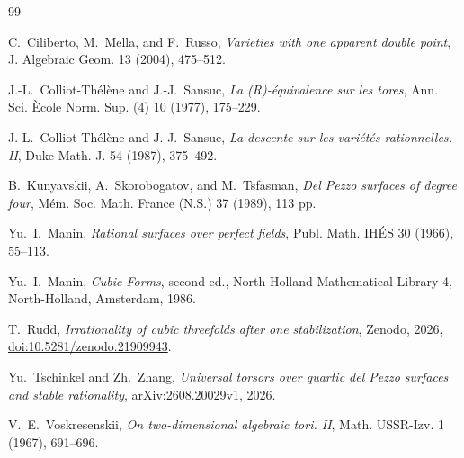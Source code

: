 \documentclass[11pt]{article}
\theoremstyle{remark}
\begin{document}
\begin{thebibliography}{99}

C.~Ciliberto, M.~Mella, and F.~Russo,
\emph{Varieties with one apparent double point},
J. Algebraic Geom. 13 (2004), 475--512.

J.-L.~Colliot-Th\'el\`ene and J.-J.~Sansuc,
\emph{La (R)-\'equivalence sur les tores},
Ann. Sci. \`Ecole Norm. Sup. (4) 10 (1977), 175--229.

J.-L.~Colliot-Th\'el\`ene and J.-J.~Sansuc,
\emph{La descente sur les vari\'et\'es rationnelles. II},
Duke Math. J. 54 (1987), 375--492.

B.~Kunyavskii, A.~Skorobogatov, and M.~Tsfasman,
\emph{Del Pezzo surfaces of degree four},
M\'em. Soc. Math. France (N.S.) 37 (1989), 113 pp.

Yu.~I.~Manin,
\emph{Rational surfaces over perfect fields},
Publ. Math. IH\'ES 30 (1966), 55--113.

Yu.~I.~Manin,
\emph{Cubic Forms}, second ed., North-Holland Mathematical Library 4,
North-Holland, Amsterdam, 1986.

T.~Rudd,
\emph{Irrationality of cubic threefolds after one stabilization},
Zenodo, 2026, \href{https://doi.org/10.5281/zenodo.21909943}
{doi:10.5281/zenodo.21909943}.

Yu.~Tschinkel and Zh.~Zhang,
\emph{Universal torsors over quartic del Pezzo surfaces and stable
rationality}, arXiv:2608.20029v1, 2026.

V.~E.~Voskresenskii,
\emph{On two-dimensional algebraic tori. II},
Math. USSR-Izv. 1 (1967), 691--696.

\end{thebibliography}
\end{document}

